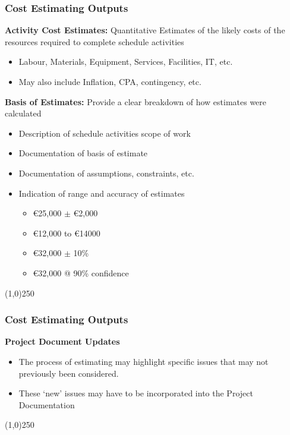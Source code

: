 \begin{frame}
\frametitle{Cost Estimating \hfill Outputs}
\textbf{Activity Cost Estimates:} Quantitative Estimates of the likely costs of the resources required to complete schedule activities
\begin{itemize}
	\item Labour, Materials, Equipment, Services, Facilities, IT, etc.
	\item May also include Inflation, CPA, contingency, etc.
\end{itemize}
\textbf{Basis of Estimates:} Provide a clear breakdown of how estimates were calculated
\begin{itemize}
	\item Description of schedule activities scope of work
	\item Documentation of basis of estimate
	\item Documentation of assumptions, constraints, etc.
	\item Indication of range and accuracy of estimates
	\begin{itemize}
		\item \euro25,000 $\pm$ \euro2,000
		\item \euro12,000 to \euro14000 
		\item \euro32,000 $\pm$ 10\%
		\item \euro32,000 @ 90\% confidence
	\end{itemize}
\end{itemize}
\end{frame}
\begin{center}\line(1,0){250}\end{center}







\begin{frame}
\frametitle{Cost Estimating \hfill Outputs}
\textbf{Project Document Updates}\\
\begin{itemize}
	\item The process of estimating may highlight specific issues that may not previously been considered.
	\item These ‘new’ issues may have to be incorporated into the Project Documentation
\end{itemize}
\end{frame}
\begin{center}\line(1,0){250}\end{center}








